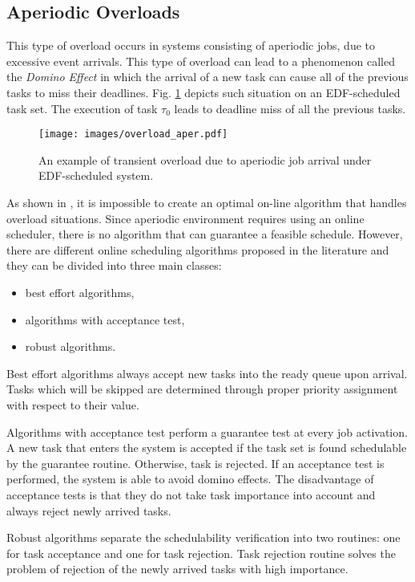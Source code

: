 \subsection{Aperiodic Overloads}
This type of overload occurs in systems consisting of aperiodic jobs, due to excessive event arrivals. 
This type of overload can lead to a phenomenon called the \textit{Domino Effect} in which the arrival of a new task can cause all of the previous tasks to miss their deadlines. 
Fig. \ref{aperiodic} depicts such situation on an EDF-scheduled task set. 
The execution of task $\tau_0$ leads to deadline miss of all the previous tasks.

\begin{figure}[ht]
    \centering
    \texttt{[image: images/overload\_aper.pdf]}
    \caption{An example of transient overload due to aperiodic job arrival under EDF-scheduled system.}
    \label{aperiodic}
\end{figure}

As shown in \cite{buttazzo2011hard}, it is impossible to create an optimal on-line algorithm that handles overload situations.
Since aperiodic environment requires using an online scheduler, there is no algorithm that can guarantee a feasible schedule.
However, there are different online scheduling algorithms proposed in the literature and they can be divided into three main classes:
\begin{itemize}
    \item{best effort algorithms,}
    \item{algorithms with acceptance test,}
    \item{robust algorithms.}
\end{itemize}

Best effort algorithms always accept new tasks into the ready queue upon arrival. Tasks which will be skipped are determined through proper priority assignment with respect to their value.

Algorithms with acceptance test perform a guarantee test at every job activation. 
A new task that enters the system is accepted if the task set is found schedulable by the guarantee routine. Otherwise, task is rejected.
If an acceptance test is performed, the system is able to avoid domino effects.
The disadvantage of acceptance tests is that they do not take task importance into account and always reject newly arrived tasks.

Robust algorithms separate the schedulability verification into two routines: one for task acceptance and one for task rejection. 
Task rejection routine solves the problem of rejection of the newly arrived tasks with high importance.

